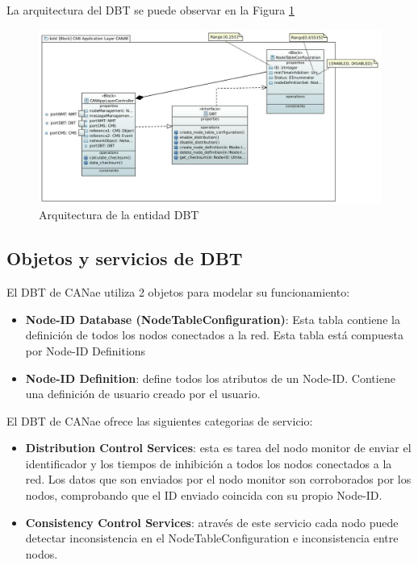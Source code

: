 La arquitectura del DBT se puede observar en la Figura \ref{fig:DBT}

\begin{figure}[h!]
 \centering
 \includegraphics[scale=0.4]{images/Secciones/AppendixA/DBT.JPG}
  \caption{Arquitectura de la entidad DBT}
\label{fig:DBT}
\end{figure} 

\subsection{Objetos y servicios de DBT}
El DBT de CANae utiliza 2 objetos para modelar su funcionamiento:
\begin{itemize}
\item \textbf{Node-ID Database (NodeTableConfiguration)}: Esta tabla contiene la
  definición de todos los nodos conectados a la red. Esta tabla está compuesta
  por Node-ID Definitions
\item \textbf{Node-ID Definition}: define todos los atributos de un Node-ID.
  Contiene una definición de usuario creado por el usuario.
\end{itemize}

El DBT de CANae ofrece las siguientes categorias de servicio:
\begin{itemize}
\item \textbf{Distribution Control Services}: esta es tarea del nodo monitor de
  enviar el identificador y los tiempos de inhibición a todos los nodos
  conectados a la red. Los datos que son enviados por el nodo monitor son
  corroborados por los nodos, comprobando que el ID enviado coincida con su
  propio Node-ID.
\item \textbf{Consistency Control Services}: através de este servicio cada nodo
  puede detectar inconsistencia en el NodeTableConfiguration e inconsistencia
  entre nodos.
\end{itemize}

